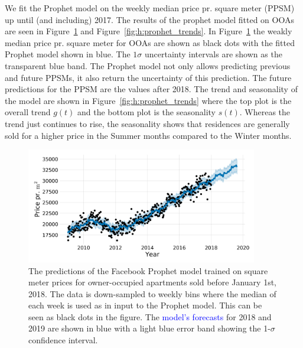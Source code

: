 We fit the Prophet model on the weekly median price pr. square meter (PPSM) up until (and including) \num{2017}. The results of the prophet model fitted on OOAs are seen in Figure~\ref{fig:h:prophet_forecast} and Figure~\ref{fig:h:prophet_trends}. In Figure~\ref{fig:h:prophet_forecast} the weakly median price pr. square meter for OOAs are shown as black dots with the fitted Prophet model shown in blue. The $1\sigma$ uncertainty intervals are shown as the transparent blue band. The Prophet model not only allows predicting previous and future PPSMs, it also return the uncertainty of this prediction. The future predictions for the PPSM are the values after 2018. The trend and seasonality of the model are shown in Figure~\ref{fig:h:prophet_trends} where the top plot is the overall trend $g(t)$ and the bottom plot is the seasonality $s(t)$. Whereas the trend just continues to rise, the seasonality shows that residences are generally sold for a higher price in the Summer months compared to the Winter months. 

\begin{figure}
  \includegraphics[draft, width=0.9\textwidth, trim=15 15 15 15, clip]{figures/housing/Ejerlejlighed_v18_cut_all_Ncols_all_prophet_forecast.png}
  \caption[Prophet Forecast for apartments]
          {The predictions of the Facebook Prophet model trained on square meter prices for owner-occupied apartments sold before January 1st, 2018. The data is down-sampled to weekly bins where the median of each week is used as in input to the Prophet model. This can be seen as black dots in the figure. The \textcolor{blue}{model's forecasts} for 2018 and 2019 are shown in blue with a light blue \textcolor{light-blue}{error band} showing the \num{1}-$\sigma$ confidence interval.
          }
  \label{fig:h:prophet_forecast}
\end{figure}

